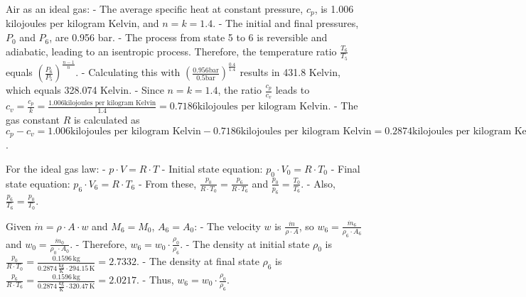 Air as an ideal gas:
- The average specific heat at constant pressure, \( c_p \), is 1.006 kilojoules per kilogram Kelvin, and \( n = k = 1.4 \).
- The initial and final pressures, \( P_0 \) and \( P_6 \), are 0.956 bar.
- The process from state 5 to 6 is reversible and adiabatic, leading to an isentropic process. Therefore, the temperature ratio \( \frac{T_6}{T_5} \) equals \( \left( \frac{P_6}{P_5} \right)^{\frac{n-1}{n}} \).
- Calculating this with \( \left( \frac{0.956 \text{bar}}{0.5 \text{bar}} \right)^{\frac{0.4}{1.4}} \) results in 431.8 Kelvin, which equals 328.074 Kelvin.
- Since \( n = k = 1.4 \), the ratio \( \frac{c_p}{c_v} \) leads to \( c_v = \frac{c_p}{k} = \frac{1.006 \text{kilojoules per kilogram Kelvin}}{1.4} = 0.7186 \text{kilojoules per kilogram Kelvin} \).
- The gas constant \( R \) is calculated as \( c_p - c_v = 1.006 \text{kilojoules per kilogram Kelvin} - 0.7186 \text{kilojoules per kilogram Kelvin} = 0.2874 \text{kilojoules per kilogram Kelvin} \).

For the ideal gas law:
- \( p \cdot V = R \cdot T \)
- Initial state equation: \( p_0 \cdot V_0 = R \cdot T_0 \)
- Final state equation: \( p_6 \cdot V_6 = R \cdot T_6 \)
- From these, \( \frac{p_0}{R \cdot T_0} = \frac{p_6}{R \cdot T_6} \) and \( \frac{p_0}{p_6} = \frac{T_0}{T_6} \).
- Also, \( \frac{p_6}{T_6} = \frac{p_0}{T_0} \).

Given \( \dot{m} = \rho \cdot A \cdot w \) and \( M_6 = M_0 \), \( A_6 = A_0 \):
- The velocity \( w \) is \( \frac{\dot{m}}{\rho \cdot A} \), so \( w_6 = \frac{\dot{m}_6}{\rho_6 \cdot A_6} \) and \( w_0 = \frac{\dot{m}_0}{\rho_0 \cdot A_0} \).
- Therefore, \( w_6 = w_0 \cdot \frac{\rho_0}{\rho_6} \).
- The density at initial state \( \rho_0 \) is \( \frac{p_0}{R \cdot T_0} = \frac{0.1596 \, \text{kg}}{0.2874 \, \frac{\text{kg}}{\text{K}} \cdot 294.15 \, \text{K}} = 2.7332 \).
- The density at final state \( \rho_6 \) is \( \frac{p_6}{R \cdot T_6} = \frac{0.1596 \, \text{kg}}{0.2874 \, \frac{\text{kg}}{\text{K}} \cdot 320.47 \, \text{K}} = 2.0217 \).
- Thus, \( w_6 = w_0 \cdot \frac{\rho_0}{\rho_6} \).